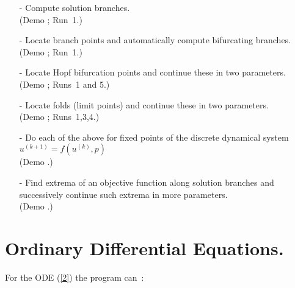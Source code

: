 \begin{itemize}
\item[-]
  Compute solution branches.\\  (Demo ; Run~1.) 
\item[-]
  Locate branch points and automatically compute
  bifurcating branches. \\ (Demo ; Run~1.)
\item[-]
  Locate Hopf bifurcation points and continue these in two
  parameters. \\ (Demo ; Runs~1 and 5.)
\item[-]
  Locate folds (limit points) and continue these 
  in two parameters. \\(Demo ; Runs~1,3,4.)
\item[-]
  Do each of the above for fixed points
  of the discrete dynamical system 
  $u^{(k+1)}= f( u^{(k)}, p )$ \\ (Demo .)
\item[-]
  Find extrema of an objective function along solution branches
  and successively continue such extrema in more parameters.
  \\ (Demo .)
\end{itemize}


\section{ Ordinary Differential Equations.} \label{sec:ODEs}
For the ODE (\ref{2}) the program can~:~
 
